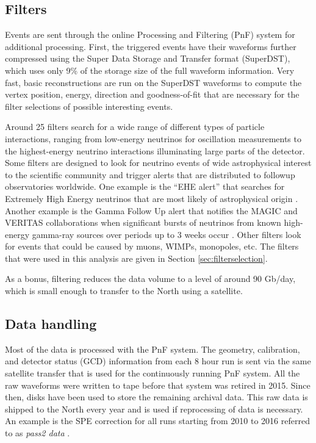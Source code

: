 \subsection{Filters}
\label{subsec:filters}
Events are sent through the online Processing and Filtering (PnF) system for additional processing. First, the triggered events have their waveforms further compressed using the Super Data Storage and Transfer format (SuperDST), which uses only 9\% of the storage size of the full waveform information. Very fast, basic reconstructions are run on the SuperDST waveforms to compute the vertex position, energy, direction and goodness-of-fit that are necessary for the filter selections of possible interesting events.

Around 25 filters search for a wide range of different types of particle interactions, ranging from low-energy neutrinos for oscillation measurements to the highest-energy neutrino interactions illuminating large parts of the detector. Some filters are designed to look for neutrino events of wide astrophysical interest to the scientific community and trigger alerts that are distributed to followup observatories worldwide. One example is the ``EHE alert'' that searches for Extremely High Energy neutrinos that are most likely of astrophysical origin \cite{Aartsen:2016lmt}. Another example is the Gamma Follow Up alert that notifies the MAGIC and VERITAS collaborations when significant bursts of neutrinos from known high-energy gamma-ray sources over periods up to 3 weeks occur \cite{1412973}. Other filters look for events that could be caused by muons, WIMPs, monopoles, etc. The filters that were used in this analysis are given in Section \ref{sec:filterselection}.

As a bonus, filtering reduces the data volume to a level of around 90 Gb/day, which is small enough to transfer to the North using a satellite.

\subsection{Data handling}
\label{subsec:datahandling}
Most of the data is processed with the PnF system. The geometry, calibration, and detector status (GCD) information from each 8 hour run is sent via the same satellite transfer that is used for the continuously running PnF system. All the raw waveforms were written to tape before that system was retired in 2015. Since then, disks have been used to store the remaining archival data. This raw data is shipped to the North every year and is used if reprocessing of data is necessary. An example is the SPE correction for all runs starting from 2010 to 2016 referred to as \textit{pass2 data} \cite{pass2}. \\

